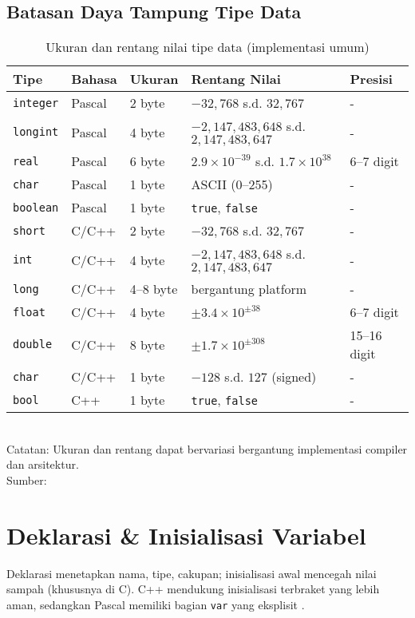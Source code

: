 \documentclass[../main.tex]{subfiles}
\begin{document}
\subsection{Batasan Daya Tampung Tipe Data}
\begin{table}[H]
  \centering
  \caption{Ukuran dan rentang nilai tipe data (implementasi umum)}
  \begin{tabular}{@{}lllll@{}}
    \toprule
    Tipe & Bahasa & Ukuran & Rentang Nilai & Presisi \\
    \midrule
    \texttt{integer} & Pascal & 2 byte & $-32{,}768$ s.d. $32{,}767$ & - \\
    \texttt{longint} & Pascal & 4 byte & $-2{,}147{,}483{,}648$ s.d. $2{,}147{,}483{,}647$ & - \\
    \texttt{real} & Pascal & 6 byte & $2.9 \times 10^{-39}$ s.d. $1.7 \times 10^{38}$ & 6--7 digit \\
    \texttt{char} & Pascal & 1 byte & ASCII (0--255) & - \\
    \texttt{boolean} & Pascal & 1 byte & \texttt{true}, \texttt{false} & - \\
    \midrule
    \texttt{short} & C/C++ & 2 byte & $-32{,}768$ s.d. $32{,}767$ & - \\
    \texttt{int} & C/C++ & 4 byte & $-2{,}147{,}483{,}648$ s.d. $2{,}147{,}483{,}647$ & - \\
    \texttt{long} & C/C++ & 4--8 byte & bergantung platform & - \\
    \texttt{float} & C/C++ & 4 byte & $\pm 3.4 \times 10^{\pm 38}$ & 6--7 digit \\
    \texttt{double} & C/C++ & 8 byte & $\pm 1.7 \times 10^{\pm 308}$ & 15--16 digit \\
    \texttt{char} & C/C++ & 1 byte & $-128$ s.d. $127$ (signed) & - \\
    \texttt{bool} & C++ & 1 byte & \texttt{true}, \texttt{false} & - \\
    \bottomrule
  \end{tabular}
  \\Catatan: Ukuran dan rentang dapat bervariasi bergantung implementasi compiler dan arsitektur.
  \\Sumber: \parencite{free-pascal-docs,iso-c-draft-n1570,cpp-fundamental-types}
\end{table}

\section{Deklarasi \& Inisialisasi Variabel}
Deklarasi menetapkan nama, tipe, cakupan; inisialisasi awal mencegah nilai sampah (khususnya di C). C++ mendukung inisialisasi terbraket yang lebih aman, sedangkan Pascal memiliki bagian \texttt{var} yang eksplisit \parencite{pascal-tutorial-wikibooks,gnu-c-manual,cpp-reference}.
\end{document}
